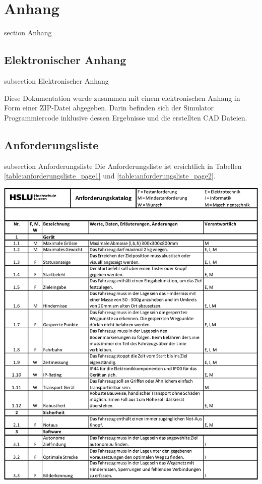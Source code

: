 \newpage

\section*{Anhang}
    {section}
    {Anhang}

\subsection*{Elektronischer Anhang}\label{elect-anhang}
{subsection}
{Elektronischer Anhang}

Diese Dokumentation wurde zusammen mit einem elektronischen Anhang in Form einer ZIP-Datei abgegeben. Darin befinden sich der Simulator Programmiercode inklusive dessen Ergebnisse und die erstellten CAD Dateien.
    
\subsection*{Anforderungsliste}\label{anforderungliste}
    {subsection}
    {Anforderungsliste}
Die  Anforderungsliste ist ersichtlich in Tabellen \ref{table:anforderungsliste_page1} und \ref{table:anforderungsliste_page2}.

\begin{table}[H]
\centering
\includegraphics[width=\textwidth]{assets/Anforderungsliste_V1.01_page1.pdf}
\caption{Anforderungsliste Teil 1}
\label{table:anforderungsliste_page1}
\end{table}
\newpage

